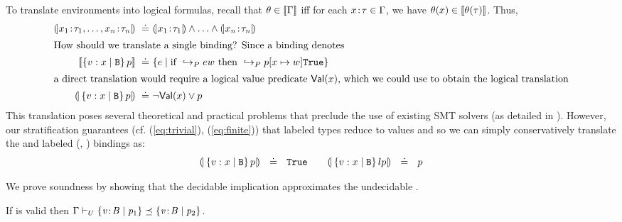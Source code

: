 To translate environments into logical formulas, recall that $\theta \in [\![\Gamma]\!]$
iff for each ${x\!:\!\tau} \in \Gamma$, we have 
$\theta(x) \in [\![\theta(\tau)]\!]$. Thus, 
%
\begin{align*}
\embed{\tbind{x_1}{\typ_1},\ldots,\tbind{x_n}{\typ_n}} \defeq &
  \embed{\tbind{x_1}{\typ_1}} \wedge \ldots \wedge \embed{\tbind{x_n}{\typ_n}}\\
\intertext{How should we translate a single binding? Since a binding denotes}
\interp{\tref{x}{\ttbase}{}{p}} \defeq &
  \{ e \mid \mbox{if } \evals{e}{w}\ \mbox{then}\ \evals{\SUBST{p}{x}{w}}{\etrue} \}\\
\intertext{a direct translation would require a logical value 
  predicate $\isvalue{x}$, which we could use to obtain the logical 
  translation}
\embed{\tref{x}{\ttbase}{}{p}} \defeq & \lnot \isvalue{x} \vee p
\end{align*}
%
This translation poses several theoretical and 
practical problems that preclude the use of existing 
SMT solvers (as detailed in ). 
However, our stratification guarantees 
(cf. (\ref{eq:trivial}), (\ref{eq:finite}))
that labeled types reduce to values and 
so we can simply conservatively translate 
the \Div and labeled (\Wnf, \Fin) bindings as:
$$(\!|\left\lbrace v : x\mid \mathtt{B}\right\rbrace{}{p}|\!)\ \ \doteq\ \ \mathtt{True} \qquad  (\!|\left\lbrace v : x\mid \mathtt{B}\right\rbrace{l}{p}|\!)\ \ \doteq\ \ p$$


 We prove soundness by showing that
the decidable implication \rtdimp approximates 
the undecidable \rimpl. 

\begin{theorem}{}\label{thm:approximation} If  is
  valid then 
  $\Gamma \vdash_U \{ {\mathit{v}\!:\!\mathit{B}} \mid \mathit{p}_1 \} \preceq \{ {\mathit{v}\!:\!\mathit{B}} \mid \mathit{p}_2 \}$.
\end{theorem}


